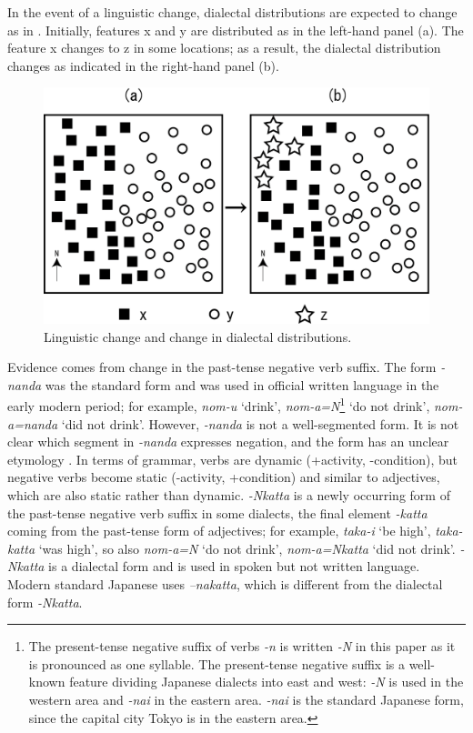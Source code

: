 \documentclass[output=paper]{LSP/langsci}
\begin{document}
In the event of a linguistic change, dialectal distributions are expected to change as in . Initially, features x and y are distributed as in the left-hand panel (a). The feature x changes to z in some locations; as a result, the dialectal distribution changes as indicated in the right-hand panel (b).

\begin{figure}
\includegraphics[width=\textwidth]{illustrations/onishi_fig1}
\caption{Linguistic change and change in dialectal distributions.}
\label{fig:1}
\end{figure}

Evidence comes from change in the past-tense negative verb suffix. The form \textit{-nanda} was the standard form and was used in official written language in the early modern period; for example, \textit{nom-u} ‘drink’, \textit{nom-a=N}\footnote{ The present-tense negative suffix of verbs \textit{-n} is written \textit{-N} in this paper as it is pronounced as one syllable. The present-tense negative suffix is a well-known feature dividing Japanese dialects into east and west: \textit{-N} is used in the western area and \textit{-nai} in the eastern area. \textit{-nai} is the standard Japanese form, since the capital city Tokyo is in the eastern area.} ‘do not drink’, \textit{nom-a=nanda} ‘did not drink’. However, \textit{{}-nanda} is not a well-segmented form. It is not clear which segment in \textit{-nanda} expresses negation, and the form has an unclear etymology \citep{onishi_atarashii_1999}. In terms of grammar, verbs are dynamic (+activity, -condition), but negative verbs become static (-activity, +condition) and similar to adjectives, which are also static rather than dynamic. \textit{-Nkatta} is a newly occurring form of the past-tense negative verb suffix in some dialects, the final element \textit{{}-katta} coming from the past-tense form of adjectives; for example, \textit{taka-i} ‘be high’, \textit{taka-katta} ‘was high’,  so also \textit{nom-a=N} ‘do not drink’, \textit{nom-a=Nkatta} ‘did not drink’. \textit{-Nkatta} is a dialectal form and is used in spoken but not written language. Modern standard Japanese uses \textit{–nakatta}, which is different from the dialectal form \textit{-Nkatta}. 
\end{document}
